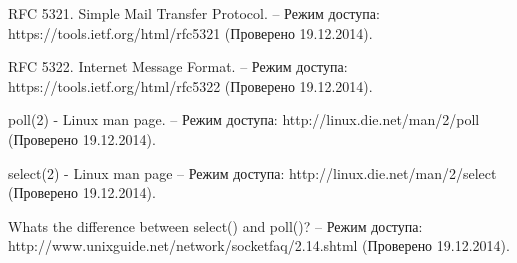 \begin{thebibliography}{1}

\begin{flushleft}
RFC 5321. Simple Mail Transfer Protocol. -- Режим доступа: https://tools.ietf.org/html/rfc5321 (Проверено 19.12.2014).
\end{flushleft}

\begin{flushleft}
RFC 5322. Internet Message Format. -- Режим доступа: https://tools.ietf.org/html/rfc5322 (Проверено 19.12.2014).
\end{flushleft}

\begin{flushleft}
poll(2) - Linux man page. -- Режим доступа: http://linux.die.net/man/2/poll (Проверено 19.12.2014).
\end{flushleft}

\begin{flushleft}
select(2) - Linux man page -- Режим доступа: http://linux.die.net/man/2/select (Проверено 19.12.2014).
\end{flushleft}

\begin{flushleft}
Whats the difference between select() and poll()? -- Режим доступа: http://www.unixguide.net/network/socketfaq/2.14.shtml (Проверено 19.12.2014).
\end{flushleft}

\end{thebibliography}

